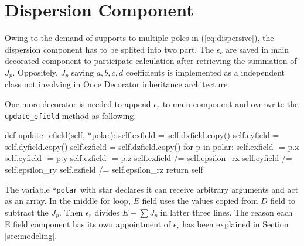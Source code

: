\section{Dispersion Component}
Owing to the demand of supports to multiple poles in (\ref{eq:dispersive}), the dispersion component has to be splited
into two part. The $\epsilon_r$ are saved in main decorated component to participate calculation after retrieving the
summation of $J_p$. Oppositely, $J_p$ saving $a,b,c,d$ coefficients is implemented as a independent class not involving
in Once Decorator inheritance architecture.

One more decorator is needed to append $\epsilon_r$ to main component and overwrite the \texttt{update\_efield} method
as following. 
\begin{code}
    def update_efield(self, *polar):
        self.exfield  = self.dxfield.copy()
        self.eyfield  = self.dyfield.copy()
        self.ezfield  = self.dzfield.copy()
        for p in polar:
            self.exfield -= p.x
            self.eyfield -= p.y
            self.ezfield -= p.z
        self.exfield /= self.epsilon_rx
        self.eyfield /= self.epsilon_ry
        self.ezfield /= self.epsilon_rz
        return self
\end{code}
The variable \texttt{*polar} with star declares it can receive arbitrary arguments and act as an array. In the middle
for loop, $E$ field uses the values copied from $D$ field to subtract the $J_p$. Then $\epsilon_r$ divides $E - \sum
J_p$ in latter three lines. The reason each E field component has its own appointment of $\epsilon_{r}$ has been
explained in Section \ref{sec:modeling}.

